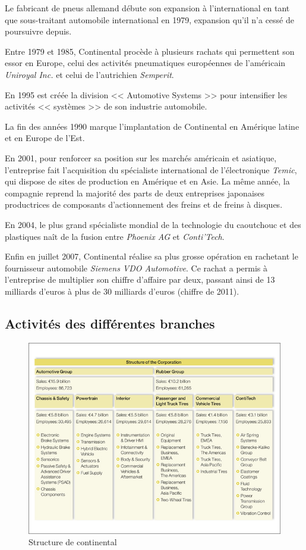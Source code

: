 		Le fabricant de pneus allemand débute son expansion à l'international en tant que sous-traitant automobile international en 1979, expansion qu'il n'a cessé de poursuivre depuis.
		
Entre 1979 et 1985, Continental procède à plusieurs rachats qui permettent son essor en Europe, celui des activités pneumatiques européennes de l'américain \textit{Uniroyal Inc.} et celui de l'autrichien \textit{Semperit}.

En 1995 est créée la division << Automotive Systems >> pour intensifier les activités << systèmes >> de son industrie automobile.

La fin des années 1990 marque l'implantation de Continental en Amérique latine et en Europe de l'Est.

En 2001, pour renforcer sa position sur les marchés américain et asiatique, l'entreprise fait l'acquisition du spécialiste international de l'électronique \textit{Temic}, qui dispose de sites de production en Amérique et en Asie. La même année, la compagnie reprend la majorité des parts de deux entreprises japonaises productrices de composants d'actionnement des freins et de freins à disques. 

En 2004, le plus grand spécialiste mondial de la technologie du caoutchouc et des plastiques naît de la fusion entre \textit{Phoenix AG} et \textit{Conti'Tech}.

Enfin en juillet 2007, Continental réalise sa plus grosse opération en rachetant le fournisseur automobile \textit{Siemens VDO Automotive}. Ce rachat a permis à l'entreprise de multiplier son chiffre d'affaire par deux, passant ainsi de 13 milliards d'euros à plus de 30 milliards d'euros (chiffre de 2011).
		
		\subsection{Activités des différentes branches}
		\begin{figure}[H]
			\centering
			\includegraphics[width=18cm]{contents/images/structureConti.jpg}
			\caption{Structure de continental}
			\label{fig:structConti}
		\end{figure}

